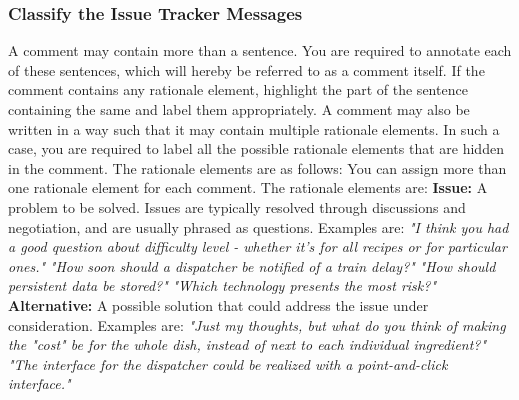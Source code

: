 \documentclass[a4paper,12pt,twoside]{report}
\begin{document}
\begin{appendices}
\subsubsection{Classify the Issue Tracker Messages}
A comment may contain more than a sentence. You are required to annotate each of these sentences, which will hereby be referred to as a comment itself. If the comment contains any rationale element, highlight the part of the sentence containing the same and label them appropriately. A comment may also be written in a way such that it may contain multiple rationale elements. In such a case, you are required to label all the possible rationale elements that are hidden in the comment. The rationale elements are as follows:
\newline \newline
You can assign more than one rationale element for each comment. The rationale elements are: 
\newline \newline
\textbf{Issue:} A problem to be solved. Issues are typically resolved through discussions and negotiation, and are usually phrased as questions. Examples are:
\newline \newline
\textit{"I think you had a good question about difficulty level - whether it's for all recipes or for particular ones."}
\newline \newline
\textit{"How soon should a dispatcher be notified of a train delay?"}
\newline \newline
\textit{"How should persistent data be stored?"}
\newline \newline
\textit{"Which technology presents the most risk?"}
\newline \newline
\textbf{Alternative:} A possible solution that could address the issue under consideration. Examples are:
\newline \newline
\textit{"Just my thoughts, but what do you think of making the "cost" be for the whole dish, instead of next to each individual ingredient?"}
\newline \newline
\textit{"The interface for the dispatcher could be realized with a point-and-click interface."}
\newline \newline

\end{appendices}
\end{document}
